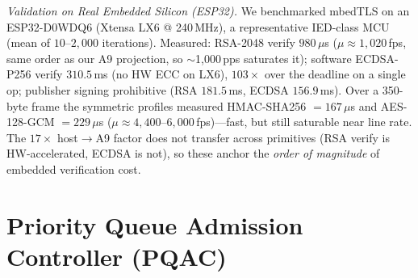\documentclass[journal]{IEEEtran}
\begin{document}
\textit{Validation on Real Embedded Silicon (ESP32).} We benchmarked mbedTLS on an \mbox{ESP32-D0WDQ6} (Xtensa LX6 @ 240\,MHz), a representative IED-class MCU (mean of $10$--$2{,}000$ iterations). Measured: RSA-2048 verify $980\,\mu$s ($\mu\approx 1{,}020$\,fps, same order as our A9 projection, so $\sim$1{,}000\,pps saturates it); software ECDSA-P256 verify $310.5$\,ms (no HW ECC on LX6), $103\times$ over the deadline on a single op; publisher signing prohibitive (RSA $181.5$\,ms, ECDSA $156.9$\,ms). Over a 350-byte frame the symmetric profiles measured HMAC-SHA256 $=167\,\mu$s and AES-128-GCM $=229\,\mu$s ($\mu\approx 4{,}400$--$6{,}000$\,fps)---fast, but still saturable near line rate. The $17\times$ host$\to$A9 factor does not transfer across primitives (RSA verify is HW-accelerated, ECDSA is not), so these anchor the \emph{order of magnitude} of embedded verification cost.

\section{Priority Queue Admission Controller (PQAC)}
\label{sec:pqac}
\end{document}
